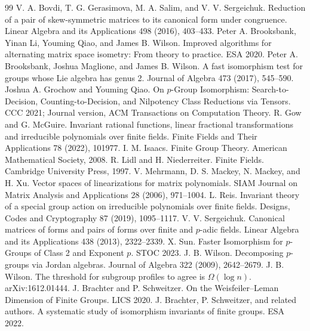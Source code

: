 \documentclass[11pt]{article}
\begin{document}
\begin{thebibliography}{99}
 V. A. Bovdi, T. G. Gerasimova, M. A. Salim, and V. V. Sergeichuk. Reduction of a pair of skew-symmetric matrices to its canonical form under congruence. Linear Algebra and its Applications 498 (2016), 403--433.
 Peter A. Brooksbank, Yinan Li, Youming Qiao, and James B. Wilson. Improved algorithms for alternating matrix space isometry: From theory to practice. ESA 2020.
 Peter A. Brooksbank, Joshua Maglione, and James B. Wilson. A fast isomorphism test for groups whose Lie algebra has genus 2. Journal of Algebra 473 (2017), 545--590.
 Joshua A. Grochow and Youming Qiao. On $p$-Group Isomorphism: Search-to-Decision, Counting-to-Decision, and Nilpotency Class Reductions via Tensors. CCC 2021; Journal version, ACM Transactions on Computation Theory.
 R. Gow and G. McGuire. Invariant rational functions, linear fractional transformations and irreducible polynomials over finite fields. Finite Fields and Their Applications 78 (2022), 101977.
 I. M. Isaacs. Finite Group Theory. American Mathematical Society, 2008.
 R. Lidl and H. Niederreiter. Finite Fields. Cambridge University Press, 1997.
 V. Mehrmann, D. S. Mackey, N. Mackey, and H. Xu. Vector spaces of linearizations for matrix polynomials. SIAM Journal on Matrix Analysis and Applications 28 (2006), 971--1004.
 L. Reis. Invariant theory of a special group action on irreducible polynomials over finite fields. Designs, Codes and Cryptography 87 (2019), 1095--1117.
 V. V. Sergeichuk. Canonical matrices of forms and pairs of forms over finite and $p$-adic fields. Linear Algebra and its Applications 438 (2013), 2322--2339.
 X. Sun. Faster Isomorphism for $p$-Groups of Class 2 and Exponent $p$. STOC 2023.
 J. B. Wilson. Decomposing $p$-groups via Jordan algebras. Journal of Algebra 322 (2009), 2642--2679.
 J. B. Wilson. The threshold for subgroup profiles to agree is $\Omega(\log n)$. arXiv:1612.01444.
 J. Brachter and P. Schweitzer. On the Weisfeiler--Leman Dimension of Finite Groups. LICS 2020.
 J. Brachter, P. Schweitzer, and related authors. A systematic study of isomorphism invariants of finite groups. ESA 2022.
\end{thebibliography}
\end{document}
